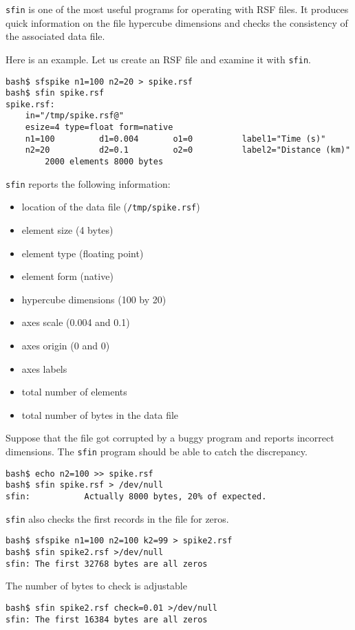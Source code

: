 \noindent\doublebox{\parbox{\textwidth}{
    
  }}

\texttt{sfin} is one of the most useful programs for operating with
RSF files. It produces quick information on the file hypercube
dimensions and checks the consistency of the associated data file.

Here is an example. Let us create an RSF file and examine it with \texttt{sfin}.
\begin{verbatim}
bash$ sfspike n1=100 n2=20 > spike.rsf
bash$ sfin spike.rsf
spike.rsf:
    in="/tmp/spike.rsf@"
    esize=4 type=float form=native
    n1=100         d1=0.004       o1=0          label1="Time (s)"
    n2=20          d2=0.1         o2=0          label2="Distance (km)"
        2000 elements 8000 bytes
\end{verbatim}
\texttt{sfin} reports the following information:
\begin{itemize}
\item location of the data file (\texttt{/tmp/spike.rsf\@})
\item element size (4 bytes)
\item element type (floating point)
\item element form (native)
\item hypercube dimensions (100 by 20)
\item axes scale (0.004 and 0.1)
\item axes origin (0 and 0)
\item axes labels
\item total number of elements
\item total number of bytes in the data file
\end{itemize}

Suppose that the file got corrupted by a buggy program and reports
incorrect dimensions. The \texttt{sfin} program should be able to
catch the discrepancy.
\begin{verbatim}
bash$ echo n2=100 >> spike.rsf
bash$ sfin spike.rsf > /dev/null
sfin:           Actually 8000 bytes, 20% of expected.
\end{verbatim}

\texttt{sfin} also checks the first records in the file for zeros. 
\begin{verbatim}
bash$ sfspike n1=100 n2=100 k2=99 > spike2.rsf
bash$ sfin spike2.rsf >/dev/null
sfin: The first 32768 bytes are all zeros
\end{verbatim}
The number of bytes to check is adjustable
\begin{verbatim}
bash$ sfin spike2.rsf check=0.01 >/dev/null
sfin: The first 16384 bytes are all zeros
\end{verbatim}


